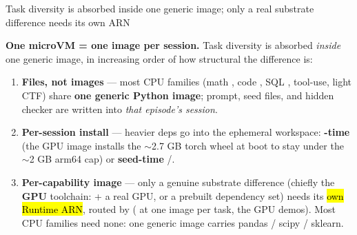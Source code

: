 \begin{frame}{Task diversity is absorbed inside one generic image; only a real substrate difference needs its own ARN}
{\footnotesize\textbf{One microVM = one image per session.} Task diversity is absorbed \emph{inside} one generic image, in increasing order of how structural the difference is:\par}
\vspace{2mm}
\begin{enumerate}\footnotesize\setlength{\itemsep}{2mm}
\item \textbf{Files, not images} --- most CPU families (math , code , SQL , tool-use, light CTF) share \textbf{one generic Python image}; prompt, seed files, and hidden checker are written into \emph{that episode's session}.
\item \textbf{Per-session install} --- heavier deps go into the ephemeral workspace: \textbf{-time} (the GPU image installs the $\sim$2.7 GB torch wheel at boot to stay under the $\sim$2 GB arm64 cap) or \textbf{seed-time} /.
\item \textbf{Per-capability image} --- only a genuine substrate difference (chiefly the \textbf{GPU} toolchain:  + a real GPU, or a prebuilt dependency set) needs its \hl{own Runtime ARN}, routed by  ( at one image per task, the GPU demos). Most CPU families need none: one generic image carries pandas / scipy / sklearn.
\end{enumerate}
\end{frame}


